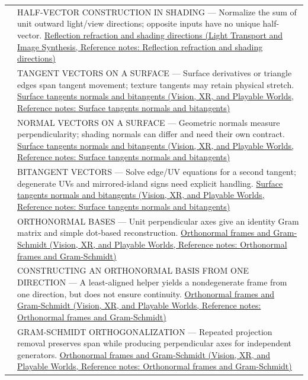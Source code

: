 {\begin{longtable}[]{@{}
  >{\raggedright\arraybackslash}p{}
  >{\raggedright\arraybackslash}p{}@{}}
555 & HALF-VECTOR CONSTRUCTION IN SHADING --- Normalize the sum of unit outward light/view directions; opposite inputs have no unique half-vector. \href{../04-Light-Transport-and-Image-Synthesis/main.pdf\#nameddest=appendix-44e00863b4d5}{Reflection refraction and shading directions (Light Transport and Image Synthesis, Reference notes: Reflection refraction and shading directions)} \\
556 & TANGENT VECTORS ON A SURFACE --- Surface derivatives or triangle edges span tangent movement; texture tangents may retain physical stretch. \href{../07-Vision-XR-and-Playable-Worlds/main.pdf\#nameddest=appendix-e31893dec985}{Surface tangents normals and bitangents (Vision, XR, and Playable Worlds, Reference notes: Surface tangents normals and bitangents)} \\
557 & NORMAL VECTORS ON A SURFACE --- Geometric normals measure perpendicularity; shading normals can differ and need their own contract. \href{../07-Vision-XR-and-Playable-Worlds/main.pdf\#nameddest=appendix-e31893dec985}{Surface tangents normals and bitangents (Vision, XR, and Playable Worlds, Reference notes: Surface tangents normals and bitangents)} \\
558 & BITANGENT VECTORS --- Solve edge/UV equations for a second tangent; degenerate UVs and mirrored-island signs need explicit handling. \href{../07-Vision-XR-and-Playable-Worlds/main.pdf\#nameddest=appendix-e31893dec985}{Surface tangents normals and bitangents (Vision, XR, and Playable Worlds, Reference notes: Surface tangents normals and bitangents)} \\
559 & ORTHONORMAL BASES --- Unit perpendicular axes give an identity Gram matrix and simple dot-based reconstruction. \href{../07-Vision-XR-and-Playable-Worlds/main.pdf\#nameddest=appendix-c39f1ed34271}{Orthonormal frames and Gram-Schmidt (Vision, XR, and Playable Worlds, Reference notes: Orthonormal frames and Gram-Schmidt)} \\
560 & CONSTRUCTING AN ORTHONORMAL BASIS FROM ONE DIRECTION --- A least-aligned helper yields a nondegenerate frame from one direction, but does not ensure continuity. \href{../07-Vision-XR-and-Playable-Worlds/main.pdf\#nameddest=appendix-c39f1ed34271}{Orthonormal frames and Gram-Schmidt (Vision, XR, and Playable Worlds, Reference notes: Orthonormal frames and Gram-Schmidt)} \\
561 & GRAM-SCHMIDT ORTHOGONALIZATION --- Repeated projection removal preserves span while producing perpendicular axes for independent generators. \href{../07-Vision-XR-and-Playable-Worlds/main.pdf\#nameddest=appendix-c39f1ed34271}{Orthonormal frames and Gram-Schmidt (Vision, XR, and Playable Worlds, Reference notes: Orthonormal frames and Gram-Schmidt)} \\

\end{longtable}}
